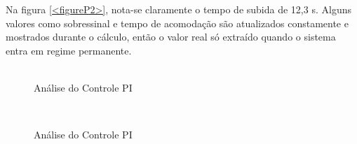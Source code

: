 \documentclass[a4paper,12pt]{article}
\begin{document}
\hspace{4ex}Na figura \ref{<figureP2>}, nota-se claramente o tempo de subida de 12,3 s. Alguns valores como sobressinal e tempo de acomodação são atualizados constamente e mostrados durante o cálculo, então o valor real só extraído quando o sistema entra em regime permanente.
\begin{figure}[H]
     \centering
     \hspace{4ex}
     \\
     
     \caption{Análise do Controle PI}
     \\
     
     \caption{Análise do Controle PI}
     \label{fig:ControlePI}
\end{figure}
\end{document}
